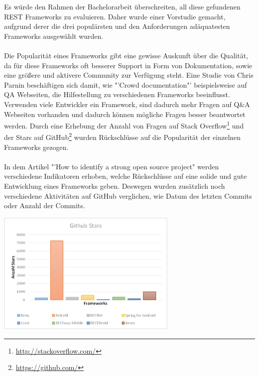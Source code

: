 Es würde den Rahmen der Bachelorarbeit überschreiten, all diese gefundenen REST Frameworks zu evaluieren. Daher wurde einer Vorstudie gemacht, aufgrund derer die drei populärsten und den Anforderungen adäquatesten Frameworks ausgewählt wurden.
\\\\
Die Popularität eines Frameworks gibt eine gewisse Auskunft über die Qualität, da für diese Frameworks oft besserer Support in Form von Dokumentation, sowie eine größere und aktivere Community zur Verfügung steht. Eine Studie von Chris Parnin\cite{parnin2012crowd} beschäftigen sich damit, wie "'Crowd documentation"' beispielsweise auf \acrfull{QA} Webseiten, die Hilfestellung zu verschiedenen Frameworks beeinflusst. Verwenden viele Entwickler ein Framework, sind dadurch mehr Fragen auf Q\&A Webseiten vorhanden und dadurch können mögliche Fragen besser beantwortet werden. Durch eine Erhebung der Anzahl von Fragen auf Stack Overflow\footnote{\href{http://stackoverflow.com/}{http://stackoverflow.com/}} und der Stars auf GitHub\footnote{\href{https://github.com/}{https://github.com/}} wurden Rückschlüsse auf die Popularität der einzelnen Frameworks gezogen.  
\\\\
In dem Artikel "'How to identify a strong open source project"\cite{balter:strongOS} werden verschiedene Indikatoren erhoben, welche Rückschlüsse auf eine solide und gute Entwicklung eines Frameworks geben. Deswegen wurden zusätzlich noch verschiedene Aktivitäten auf GitHub verglichen, wie Datum des letzten Commits oder Anzahl der Commits.

\begin{minipage}{\textwidth} 
	\centering	
	\includegraphics[width=0.65\textwidth]{figures/github_stars.png}
	\label{figure:githubStars}
	\vspace{2ex}
\end{minipage}

